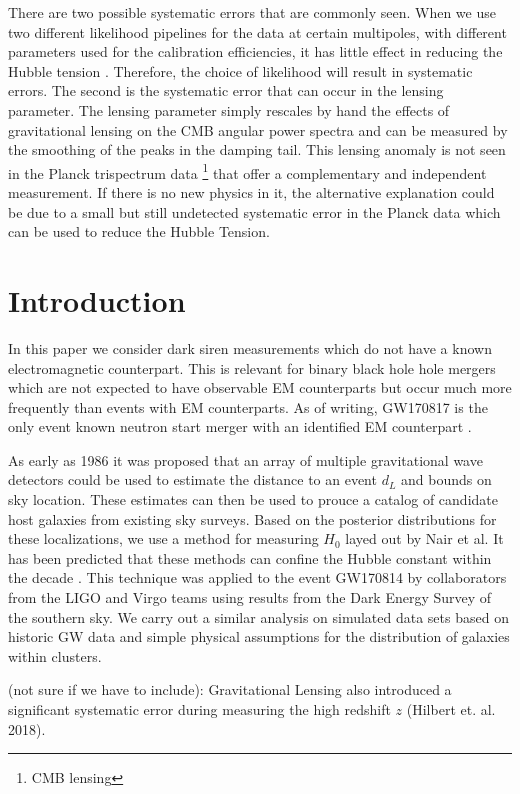 There are two possible systematic errors that are commonly seen. When we use two different likelihood pipelines for the data at certain multipoles, with different parameters used for the calibration efficiencies, it has little effect in reducing the Hubble tension \cite{Efstathiou_2021}. Therefore, the choice of likelihood will result in systematic errors. 
The second is the systematic error that can occur in the lensing parameter\cite{Calabrese_2008}. The lensing parameter simply rescales by hand the effects of gravitational lensing on the CMB angular power spectra and can be measured by the smoothing of the peaks in the damping tail. This lensing anomaly is not seen in the
Planck trispectrum data \footnote{CMB lensing} that offer a complementary and independent measurement. If there is no new physics in it, the alternative explanation could be due to a small but still undetected systematic error in the Planck data which can be used to reduce the Hubble Tension.

\section{\label{sec:intro} Introduction}
In this paper we consider dark siren measurements which do not have a known electromagnetic counterpart. This is relevant for binary black hole hole mergers which are not expected to have observable EM counterparts but occur much more frequently than events with EM counterparts. As of writing, GW170817 is the only event known neutron start merger with an identified EM counterpart \cite{GW170817_announce}.

As early as 1986 it was proposed that an array of multiple gravitational wave detectors could be used to estimate the distance to an event $d_L$ and bounds on sky location\cite{Schutz_1986}. These estimates can then be used to prouce a catalog of candidate host galaxies from existing sky surveys. Based on the posterior distributions for these localizations, we use a method for measuring $H_0$ layed out by Nair et al\cite{Nair_2018}. It has been predicted that these methods can confine the Hubble constant within the decade \cite{Chen_2018}. This technique was applied to the event GW170814 by collaborators from the LIGO and Virgo teams using results from the Dark Energy Survey of the southern sky\cite{GW170814_DES}. We carry out a similar analysis on simulated data sets based on historic GW data and simple physical assumptions for the distribution of galaxies within clusters.



(not sure if we have to include):
Gravitational Lensing also introduced a significant systematic error during measuring the high redshift $z$ (Hilbert et. al. 2018). 
